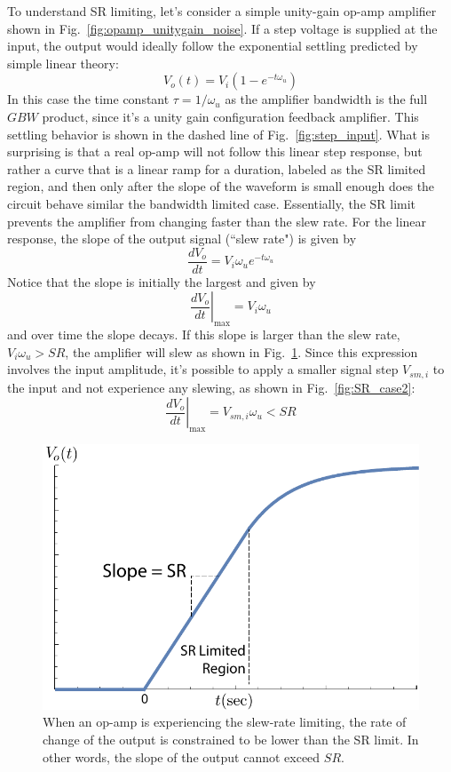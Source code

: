 To understand SR limiting, let's consider a simple unity-gain op-amp amplifier shown in Fig.~\ref{fig:opamp_unitygain_noise}.  If a step voltage is supplied at the input, the output would ideally  follow the exponential settling predicted by simple linear theory:
%
\begin{equation}
	V_o(t) = V_i \left( 1 - e^{-t \omega_u} \right) 
\end{equation}
%
In this case the time constant $\tau = 1/\omega_u$ as the amplifier bandwidth is the full $GBW$ product, since it's a unity gain configuration feedback amplifier.  This settling behavior is shown in the dashed line of Fig.~\ref{fig:step_input}.  What is surprising is that a real op-amp will not follow this linear step response, but rather a curve that is a linear ramp for a duration, labeled as the SR limited region, and then only after the slope of the waveform is small enough does the circuit behave similar the bandwidth limited case.  Essentially, the SR limit prevents the amplifier from changing faster than the slew rate.  For the linear response, the  slope of the output signal (``slew rate") is given by
%
\begin{equation}
	\frac{dV_{o}}{dt} = V_i \omega_u e^{-t \omega_u}
\end{equation}
%
Notice that the slope is initially the largest and given by
%
\begin{equation}
	\left. \frac{dV_{o}}{dt} \right|_{\text{max}} = V_i \omega_u
\end{equation}
%
and over time the slope decays. If this slope is larger than the slew rate, $V_i \omega_u > SR$, the amplifier will slew as shown in Fig.~\ref{fig:SR_case1}.  Since this expression involves the input amplitude, it's possible to apply a smaller signal step $V_{sm,i}$ to the input and not experience any slewing, as shown in Fig.~\ref{fig:SR_case2}:  
%
\begin{equation}
	\left. \frac{dV_{o}}{dt} \right|_{\text{max}} = V_{sm,i} \omega_u  < SR
\end{equation}
%



\begin{figure}[tb]
\begin{center}
\includegraphics[width=.65\columnwidth]{SR_case1}
\end{center}
\caption{When an op-amp is experiencing the slew-rate limiting, the rate of change of the output is constrained to be lower than the SR limit.  In other words, the slope of the output cannot exceed $SR$.} \label{fig:SR_case1}
\end{figure} 

